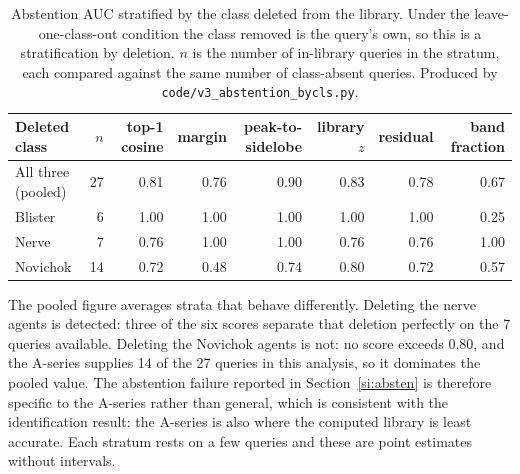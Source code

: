 \begin{table}[htbp]
\centering
\caption{Abstention AUC stratified by the class deleted from the library. Under the
leave-one-class-out condition the class removed is the query's own, so this is a
stratification by deletion. $n$ is the number of in-library queries in the stratum, each
compared against the same number of class-absent queries. Produced by
\texttt{code/v3\_abstention\_bycls.py}.}
\label{tab:si-abstbycls}
\small
\begin{tabular}{lrrrrrrr}
\toprule
Deleted class & $n$ & top-1 cosine & margin & peak-to-sidelobe & library $z$ & residual & band fraction \\
\midrule
All three (pooled) & 27 & 0.81 & 0.76 & 0.90 & 0.83 & 0.78 & 0.67 \\
\addlinespace
Blister & 6 & 1.00 & 1.00 & 1.00 & 1.00 & 1.00 & 0.25 \\
Nerve & 7 & 0.76 & 1.00 & 1.00 & 0.76 & 0.76 & 1.00 \\
Novichok & 14 & 0.72 & 0.48 & 0.74 & 0.80 & 0.72 & 0.57 \\
\bottomrule
\end{tabular}

\begin{flushleft}\footnotesize The pooled figure averages strata that behave differently.
Deleting the nerve agents is detected: three of the six scores separate that deletion
perfectly on the 7 queries available. Deleting the Novichok
agents is not: no score exceeds 0.80, and the
A-series supplies 14 of the 27 queries in this analysis, so it dominates the
pooled value. The abstention failure reported in Section~\ref{si:absten} is therefore
specific to the A-series rather than general, which is consistent with the identification
result: the A-series is also where the computed library is least accurate. Each stratum
rests on a few queries and these are point estimates without intervals.\end{flushleft}
\end{table}
